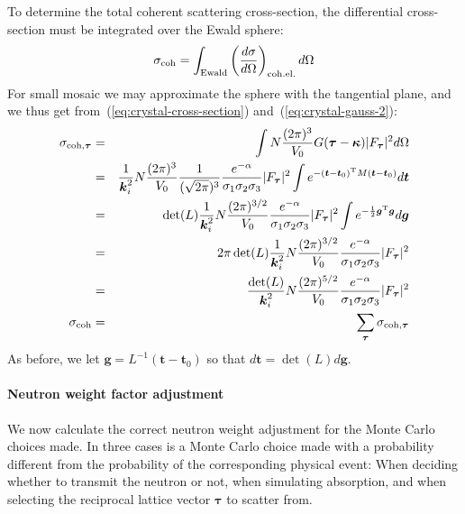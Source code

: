 To determine the total coherent scattering cross-section, the differential
cross-section must be integrated over the Ewald sphere:
$$
\sigma_{\rm coh} = \int_{\rm Ewald}
\left(\frac{d\sigma}{d\Omega}\right)_{\rm coh.el.} d\Omega
$$
For small mosaic we may approximate the sphere with the tangential
plane, and we thus get from~(\ref{eq:crystal-cross-section})
and~(\ref{eq:crystal-gauss-2}):
\begin{eqnarray}
  \label{eq:crystal-coh-cs}
  \sigma_{{\rm coh},\boldsymbol{\tau}} &=& \int N\frac{(2\pi)^3}{V_0}
        G(\boldsymbol{\tau} - \boldsymbol{\kappa})
         |F_{\boldsymbol{\tau}}|^2 d\Omega \\
  &=& \frac{1}{\boldsymbol{k}_i^2} N\frac{(2\pi)^3}{V_0}
         \frac{1}{(\sqrt{2\pi})^3}\frac{e^{-\alpha}}{\sigma_1\sigma_2\sigma_3}
         |F_{\boldsymbol{\tau}}|^2
         \int e^{-(\boldsymbol{t}-\boldsymbol{t}_0)^{\rm T} M
         (\boldsymbol{t}-\boldsymbol{t}_0)}
         d\boldsymbol{t} \\
  &=& \det(L) \frac{1}{\boldsymbol{k}_i^2} N\frac{(2\pi)^{3/2}}{V_0}
         \frac{e^{-\alpha}}{\sigma_1\sigma_2\sigma_3}
         |F_{\boldsymbol{\tau}}|^2
         \int e^{-\frac{1}{2}\boldsymbol{g}^{\rm T}\boldsymbol{g}}
         d\boldsymbol{g} \\
  &=& 2\pi\det(L) \frac{1}{\boldsymbol{k}_i^2} N\frac{(2\pi)^{3/2}}{V_0}
         \frac{e^{-\alpha}}{\sigma_1\sigma_2\sigma_3}
         |F_{\boldsymbol{\tau}}|^2 \\
  &=& \frac{\det(L)}{\boldsymbol{k}_i^2} N\frac{(2\pi)^{5/2}}{V_0}
         \frac{e^{-\alpha}}{\sigma_1\sigma_2\sigma_3}
         |F_{\boldsymbol{\tau}}|^2 \\
  \sigma_{\rm coh} &=& \sum_{\boldsymbol{\tau}} \sigma_{{\rm coh},\boldsymbol{\tau}}
\end{eqnarray}
As before, we let $\boldsymbol{g} = L^{-1}(\boldsymbol{t} -
\boldsymbol{t}_0)$ so that $d\boldsymbol{t} = \det(L) d\boldsymbol{g}$.

\paragraph{Neutron weight factor adjustment}

We now calculate the correct neutron weight adjustment for the Monte
Carlo choices made. In three cases is a Monte Carlo choice made with a
probability different from the probability of the corresponding physical
event: When deciding whether to transmit the neutron or not, when
simulating absorption, and when selecting the reciprocal lattice vector
$\boldsymbol{\tau}$ to scatter from.


